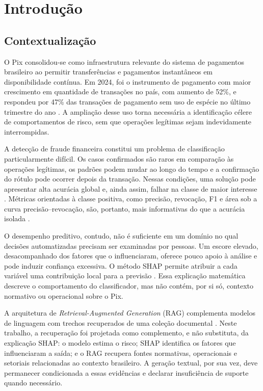 \chapter{Introdução}

\section{Contextualização}

O Pix consolidou-se como infraestrutura relevante do sistema de pagamentos brasileiro ao permitir transferências e pagamentos instantâneos em disponibilidade contínua. Em 2024, foi o instrumento de pagamento com maior crescimento em quantidade de transações no país, com aumento de 52\%, e respondeu por 47\% das transações de pagamento sem uso de espécie no último trimestre do ano \cite{bcb_pagamentos_2024}. A ampliação desse uso torna necessária a identificação célere de comportamentos de risco, sem que operações legítimas sejam indevidamente interrompidas.

A detecção de fraude financeira constitui um problema de classificação particularmente difícil. Os casos confirmados são raros em comparação às operações legítimas, os padrões podem mudar ao longo do tempo e a confirmação do rótulo pode ocorrer depois da transação. Nessas condições, uma solução pode apresentar alta acurácia global e, ainda assim, falhar na classe de maior interesse \cite{abdallah2016survey,dalpozzolo2018realistic}. Métricas orientadas à classe positiva, como precisão, revocação, F1 e área sob a curva precisão--revocação, são, portanto, mais informativas do que a acurácia isolada \cite{saito2015precision}.

O desempenho preditivo, contudo, não é suficiente em um domínio no qual decisões automatizadas precisam ser examinadas por pessoas. Um escore elevado, desacompanhado dos fatores que o influenciaram, oferece pouco apoio à análise e pode induzir confiança excessiva. O método SHAP permite atribuir a cada variável uma contribuição local para a previsão \cite{lundberg2017unified}. Essa explicação matemática descreve o comportamento do classificador, mas não contém, por si só, contexto normativo ou operacional sobre o Pix.

A arquitetura de \emph{Retrieval-Augmented Generation} (RAG) complementa modelos de linguagem com trechos recuperados de uma coleção documental \cite{lewis2020rag}. Neste trabalho, a recuperação foi projetada como complemento, e não substituta, da explicação SHAP: o modelo estima o risco; SHAP identifica os fatores que influenciaram a saída; e o RAG recupera fontes normativas, operacionais e setoriais relacionadas ao contexto brasileiro. A geração textual, por sua vez, deve permanecer condicionada a essas evidências e declarar insuficiência de suporte quando necessário.

